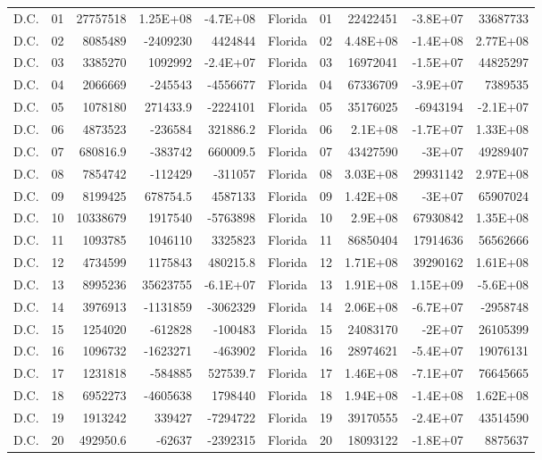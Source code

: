 \begin{landscape}
\begin{singlespace}
\begin{longtable}{lrrrr|lrrrr}
		D.C. &  01  & 27757518 & 1.25E+08 & -4.7E+08 & Florida &  01  & 22422451 & -3.8E+07 & 33687733 \\
		D.C. &  02  & 8085489 & -2409230 & 4424844 & Florida &  02  & 4.48E+08 & -1.4E+08 & 2.77E+08 \\
		D.C. &  03  & 3385270 & 1092992 & -2.4E+07 & Florida &  03  & 16972041 & -1.5E+07 & 44825297 \\
		D.C. &  04  & 2066669 & -245543 & -4556677 & Florida &  04  & 67336709 & -3.9E+07 & 7389535 \\
		D.C. &  05  & 1078180 & 271433.9 & -2224101 & Florida &  05  & 35176025 & -6943194 & -2.1E+07 \\
		D.C. &  06  & 4873523 & -236584 & 321886.2 & Florida &  06  & 2.1E+08 & -1.7E+07 & 1.33E+08 \\
		D.C. &  07  & 680816.9 & -383742 & 660009.5 & Florida &  07  & 43427590 & -3E+07 & 49289407 \\
		D.C. &  08  & 7854742 & -112429 & -311057 & Florida &  08  & 3.03E+08 & 29931142 & 2.97E+08 \\
		D.C. &  09  & 8199425 & 678754.5 & 4587133 & Florida &  09  & 1.42E+08 & -3E+07 & 65907024 \\
		D.C. &  10 & 10338679 & 1917540 & -5763898 & Florida &  10 & 2.9E+08 & 67930842 & 1.35E+08 \\
		D.C. &  11 & 1093785 & 1046110 & 3325823 & Florida &  11 & 86850404 & 17914636 & 56562666 \\
		D.C. &  12 & 4734599 & 1175843 & 480215.8 & Florida &  12 & 1.71E+08 & 39290162 & 1.61E+08 \\
		D.C. &  13 & 8995236 & 35623755 & -6.1E+07 & Florida &  13 & 1.91E+08 & 1.15E+09 & -5.6E+08 \\
		D.C. &  14 & 3976913 & -1131859 & -3062329 & Florida &  14 & 2.06E+08 & -6.7E+07 & -2958748 \\
		D.C. &  15 & 1254020 & -612828 & -100483 & Florida &  15 & 24083170 & -2E+07 & 26105399 \\
		D.C. &  16 & 1096732 & -1623271 & -463902 & Florida &  16 & 28974621 & -5.4E+07 & 19076131 \\
		D.C. &  17 & 1231818 & -584885 & 527539.7 & Florida &  17 & 1.46E+08 & -7.1E+07 & 76645665 \\
		D.C. &  18 & 6952273 & -4605638 & 1798440 & Florida &  18 & 1.94E+08 & -1.4E+08 & 1.62E+08 \\
		D.C. &  19 & 1913242 & 339427 & -7294722 & Florida &  19 & 39170555 & -2.4E+07 & 43514590 \\
		D.C. &  20 & 492950.6 & -62637 & -2392315 & Florida &  20 & 18093122 & -1.8E+07 & 8875637 \\

\end{longtable}
\end{singlespace}
\end{landscape}
